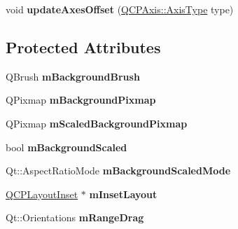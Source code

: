 \begin{DoxyCompactItemize}
\item 
void {\bfseries update\+Axes\+Offset} (\hyperlink{class_q_c_p_axis_ae2bcc1728b382f10f064612b368bc18a}{Q\+C\+P\+Axis\+::\+Axis\+Type} type)\hypertarget{class_q_c_p_axis_rect_a6024ccdc74f5dc0e8a0fe482e5b28a20}{}\label{class_q_c_p_axis_rect_a6024ccdc74f5dc0e8a0fe482e5b28a20}

\end{DoxyCompactItemize}
\subsection*{Protected Attributes}
\begin{DoxyCompactItemize}
\item 
Q\+Brush {\bfseries m\+Background\+Brush}\hypertarget{class_q_c_p_axis_rect_a5748e1a37f63c428e38b0a7724b46259}{}\label{class_q_c_p_axis_rect_a5748e1a37f63c428e38b0a7724b46259}

\item 
Q\+Pixmap {\bfseries m\+Background\+Pixmap}\hypertarget{class_q_c_p_axis_rect_a38fb1a15f43228a0c124553649303722}{}\label{class_q_c_p_axis_rect_a38fb1a15f43228a0c124553649303722}

\item 
Q\+Pixmap {\bfseries m\+Scaled\+Background\+Pixmap}\hypertarget{class_q_c_p_axis_rect_aa74b9415598d59b49290e41e42d7ee27}{}\label{class_q_c_p_axis_rect_aa74b9415598d59b49290e41e42d7ee27}

\item 
bool {\bfseries m\+Background\+Scaled}\hypertarget{class_q_c_p_axis_rect_a5ad835f0fae5d7cc5ada9e063641dbf1}{}\label{class_q_c_p_axis_rect_a5ad835f0fae5d7cc5ada9e063641dbf1}

\item 
Qt\+::\+Aspect\+Ratio\+Mode {\bfseries m\+Background\+Scaled\+Mode}\hypertarget{class_q_c_p_axis_rect_a859fd368e794663e346b4f53f35078e9}{}\label{class_q_c_p_axis_rect_a859fd368e794663e346b4f53f35078e9}

\item 
\hyperlink{class_q_c_p_layout_inset}{Q\+C\+P\+Layout\+Inset} $\ast$ {\bfseries m\+Inset\+Layout}\hypertarget{class_q_c_p_axis_rect_aecc8c4a23820ed82017ca998f3d2c526}{}\label{class_q_c_p_axis_rect_aecc8c4a23820ed82017ca998f3d2c526}

\item 
Qt\+::\+Orientations {\bfseries m\+Range\+Drag}\hypertarget{class_q_c_p_axis_rect_aa9f107f66ca3469ad50ee6cea7c9e237}{}\label{class_q_c_p_axis_rect_aa9f107f66ca3469ad50ee6cea7c9e237}


\end{DoxyCompactItemize}
